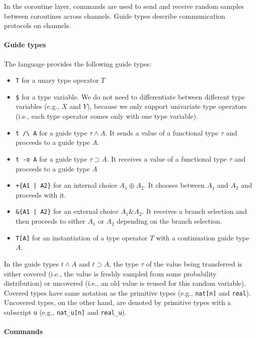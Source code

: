 In the coroutine layer, commands are used to send and receive random samples
between coroutines across channels.
%
Guide types describe communication protocols on channels.

\paragraph{Guide types}

The language provides the following guide types:
\begin{itemize}
  \item \texttt{T} for a unary type operator $T$
  \item \texttt{\$} for a type variable.
        We do not need to differentiate between different type variables (e.g.,
        $X$ and $Y$), because we only support univariate type operators (i.e.,
        each type operator comes only with one type variable).
  \item \verb$t /\ A$ for a guide type $\tau \land A$.
        It sends a value of a functional type $\tau$ and proceeds to a guide
        type $A$.
  \item \texttt{t -o A} for a guide type $\tau \supset A$.
        It receives a value of a functional type $\tau$ and proceeds to a guide
        type $A$
  \item \verb$+{A1 | A2}$ for an internal choice $A_1 \oplus A_2$.
        It chooses between $A_1$ and $A_2$ and proceeds with it.
  \item \verb$&{A1 | A2}$ for an external choice $A_1 \mathrel{\&} A_2$.
        It receives a branch selection and then proceeds to either $A_1$ or
        $A_2$ depending on the branch selection.
  \item \texttt{T[A]} for an instantiation of a type operator $T$ with a
        continuation guide type $A$.
\end{itemize}
%
In the guide types $t \land A$ and $t \supset A$, the type $\tau$ of the value
being transferred is either covered (i.e., the value is freshly sampled from
some probability distribution) or uncovered (i.e., an old value is reused for
this random variable).
%
Covered types have same notation as the primitive types (e.g., \texttt{nat[n]}
and \texttt{real}).
%
Uncovered types, on the other hand, are denoted by primitive types with a
subscript \texttt{u} (e.g., \texttt{nat\_u[n]} and \texttt{real\_u}).

\paragraph{Commands}

